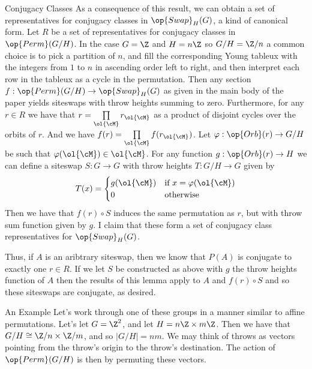 \documentclass[12nt]{article}
\theoremstyle{plain}
\begin{document}
\begin{subsection}{Conjugacy Classes}
As a consequence of this result, we can obtain a set of representatives for conjugacy classes in $\op{Swap}_H(G)$, a kind of canonical form. Let $R$ be a set of representatives for conjugacy classes in $\op{Perm}(G/H)$. In the case $G = \Z$ and $H = n\Z$ so $G/H = \Z/n$ a common choice is to pick a partition of $n$, and fill the corresponding Young tableux with the integers from $1$ to $n$ in ascending order left to right, and then interpret each row in the tableux as a cycle in the permutation. 
Then any section $f : \op{Perm}(G/H) \to \op{Swap}_H(G)$ as given in the main body of the paper yields siteswaps with throw heights summing to zero. Furthermore, for any $r \in R$ we have that $r = \prod \limits_{\ol{\cM}} r_{\ol{\cM}}$ as a product of disjoint cycles over the orbits of $r$. And we have $f(r) = \prod \limits_{\ol{\cM}} f(r_{\ol{\cM}})$. Let $\varphi : \op{Orb}(r) \to G/H$ be such that $\varphi(\ol{\cM}) \in \ol{\cM}$. For any function $g : \op{Orb}(r) \to H$ we can define a siteswap $S : G \to G$ with throw heights $T : G/H \to G$ given by 
\[
	T(x) = \begin{cases}
		g(\ol{\cM}) & \text{if } x = \varphi(\ol{\cM}) \\
		0 & \text{otherwise}
	\end{cases}
\]
Then we have that $f(r) \circ S$ induces the same permutation as $r$, but with throw sum function given by $g$. I claim that these form a set of conjugacy class representatives for $\op{Swap}_H(G)$.

Thus, if $A$ is an aribtrary siteswap, then we know that $P(A)$ is conjugate to exactly one $r \in R$. If we let $S$ be constructed as above with $g$ the throw heights function of $A$ then the results of this lemma apply to $A$ and $f(r) \circ S$ and so these siteswaps are conjugate, as desired.

\begin{subsection}{An Example}
Let's work through one of these groups in a manner similar to affine permutations. Let's let $G = \Z^2$, and let $H = n\Z \times m\Z$. Then we have that $G/H \cong \Z/n \times \Z/m$, and so $|G/H| = nm$. We may think of throws as vectors pointing from the throw's origin to the throw's destination. The action of $\op{Perm}(G/H)$ is then by permuting these vectors. 


\end{subsection}
\end{subsection}
\end{document}
